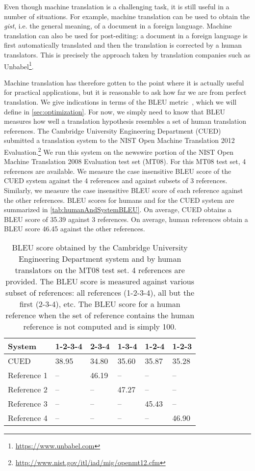 Even though machine translation is a challenging task, it is
still useful in a number of situations. For example, machine
translation can be used to obtain the \emph{gist}, i.e. the general
meaning, of a document
in a foreign language. Machine translation can also be
used for post-editing: a document in a foreign language
is first automatically translated and then the translation
is corrected by a human translators. This is precisely
the approach taken by translation companies such
as Unbabel\footnote{\url{https://www.unbabel.com}}.

Machine translation has therefore gotten to the point
where it is actually useful for practical applications, but
it is reasonable to ask how far we are from perfect translation.
We give indications in terms of the BLEU
metric~\citep{papineni-roukos-ward-zhu:2002:ACL},
which we will define in \autoref{sec:optimization}.
For now, we simply need to know that BLEU measures how well
a translation hypothesis resembles a set of human translation
references. The Cambridge University Engineering Department (CUED)
submitted a translation system to the NIST Open Machine Translation 2012
Evaluation.\footnote{\url{http://www.nist.gov/itl/iad/mig/openmt12.cfm}}
We run this system on the newswire portion of the
NIST Open Machine Translation 2008 Evaluation test set (MT08).
For this MT08 test set, 4 references are available. We measure
the case insensitive BLEU score of the CUED system against
the 4 references and against subsets of 3 references. Similarly,
we measure the case insensitive BLEU score of each reference
against the other references. BLEU scores for humans and for
the CUED system are summarized in \autoref{tab:humanAndSystemBLEU}.
On average, CUED obtains a
BLEU score of 35.39 against 3 references. On average, human
references obtain a BLEU score 46.45 against the other
references.
%
\begin{table}
  \begin{center}
    \begin{tabular}{l|lllll}
      System & 1-2-3-4 & 2-3-4 & 1-3-4 & 1-2-4 & 1-2-3 \\
      \hline
      CUED   & 38.95 & 34.80 & 35.60 & 35.87 & 35.28 \\
      \hline
      Reference 1 & -- & 46.19 & -- & -- & -- \\
      Reference 2 & -- & -- & 47.27 & -- & -- \\
      Reference 3 & -- & -- & -- & 45.43 & -- \\
      Reference 4 & -- & -- & -- & -- & 46.90
    \end{tabular}
    \caption{BLEU score obtained by the Cambridge University Engineering Department
    system and by human translators on the MT08 test set. 4 references are
    provided. The BLEU score is measured against various subset of references: all
    references (1-2-3-4), all but the first (2-3-4), etc. The BLEU score for
    a human reference when the set of reference contains the human reference is
    not computed and is simply 100.}
    \label{tab:humanAndSystemBLEU}
  \end{center}
\end{table}

